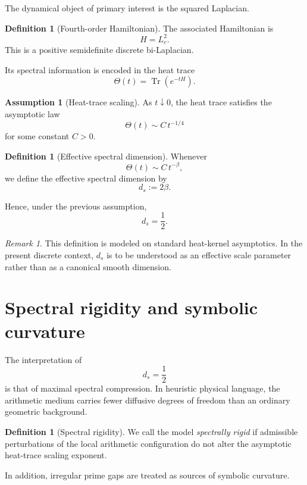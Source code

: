 \documentclass[11pt,a4paper]{amsart}
\theoremstyle{plain}
\theoremstyle{definition}
\newtheorem{definition}[theorem]{Definition}
\newtheorem{assumption}[theorem]{Assumption}
\theoremstyle{remark}
\newtheorem{remark}[theorem]{Remark}
\newcommand{\Tr}{\operatorname{Tr}}
\newcommand{\ThetaH}{\Theta}
\newcommand{\Lc}{L_c}
\begin{document}
	The dynamical object of primary interest is the squared Laplacian.
	
	\begin{definition}[Fourth-order Hamiltonian]
		The associated Hamiltonian is
		\[
		H=\Lc^2.
		\]
		This is a positive semidefinite discrete bi-Laplacian.
	\end{definition}
	
	Its spectral information is encoded in the heat trace
	\[
	\ThetaH(t)=\Tr(e^{-tH}).
	\]
	
	\begin{assumption}[Heat-trace scaling]
		As $t\downarrow 0$, the heat trace satisfies the asymptotic law
		\[
		\ThetaH(t)\sim C\,t^{-1/4}
		\]
		for some constant $C>0$.
	\end{assumption}
	
	\begin{definition}[Effective spectral dimension]
		Whenever
		\[
		\ThetaH(t)\sim C\,t^{-\beta},
		\]
		we define the effective spectral dimension by
		\[
		d_s:=2\beta.
		\]
	\end{definition}
	
	Hence, under the previous assumption,
	\[
	d_s=\frac12.
	\]
	
	\begin{remark}
		This definition is modeled on standard heat-kernel asymptotics. In the present discrete context, $d_s$ is to be understood as an effective scale parameter rather than as a canonical smooth dimension.
	\end{remark}
	
	\section{Spectral rigidity and symbolic curvature}
	
	The interpretation of
	\[
	d_s=\frac12
	\]
	is that of maximal spectral compression. In heuristic physical language, the arithmetic medium carries fewer diffusive degrees of freedom than an ordinary geometric background.
	
	\begin{definition}[Spectral rigidity]
		We call the model \emph{spectrally rigid} if admissible perturbations of the local arithmetic configuration do not alter the asymptotic heat-trace scaling exponent.
	\end{definition}
	
	In addition, irregular prime gaps are treated as sources of symbolic curvature.
	
\end{document}
